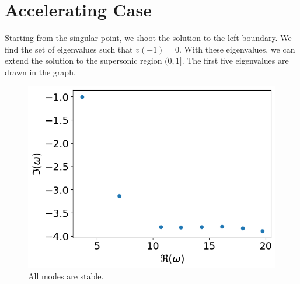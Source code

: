 \section{Accelerating Case}
Starting from the singular point, we shoot the solution to the left boundary. We find the set of eigenvalues such that $\tilde{v}(-1)=0$. With these eigenvalues, we can extend the solution to the supersonic region $(0,1]$. The first five eigenvalues are drawn in the graph.
\begin{figure} [H]
	\centering
	\includegraphics[width=0.7\linewidth]{../../thesis/img/numerical-experiments/accelerating-v}
	\caption{All modes are stable.}
	\label{fig:accelerating-v}
\end{figure}
